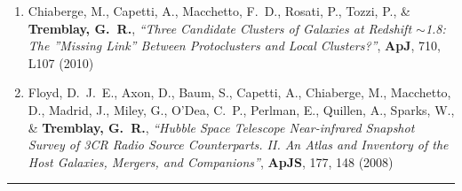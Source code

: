 \documentclass[11pt]{article}
\makeatletter
\def\vhrulefill#1{\leavevmode\leaders\hrule\@height#1\hfill \kern\z@}
\makeatother
\begin{document}
\begin{enumerate}[resume]
  


\item Chiaberge, M., Capetti, A., Macchetto, F.~D., Rosati, P., Tozzi, P., 
\& {\bf Tremblay, G.~R.}, {\it ``Three Candidate Clusters of Galaxies at Redshift $\sim$1.8: The ''Missing Link'' Between Protoclusters and Local Clusters?''}, \textbf{ApJ}, 710,  L107 (2010)





\item Floyd, D.~J.~E., Axon, D., Baum, S., Capetti, A., Chiaberge, M., 
Macchetto, D., Madrid, J., Miley, G., O'Dea, C.~P., Perlman, E., Quillen, 
A., Sparks, W., 
\& {\bf Tremblay, G.~R.},  {\it ``Hubble Space Telescope Near-infrared Snapshot Survey of 3CR Radio Source Counterparts. II. An Atlas and Inventory of the Host Galaxies, Mergers, and Companions''}, \textbf{ApJS}, 177,  148 (2008)

\end{enumerate}

 \vhrulefill{0.4pt}
\end{document}
